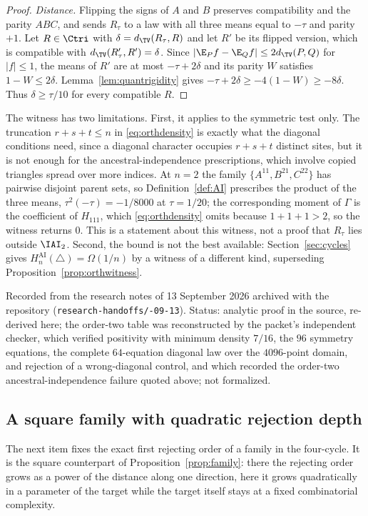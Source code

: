 \begin{proof}
\emph{Distance.} Flipping the signs of $A$ and $B$ preserves compatibility and the parity $ABC$, and sends $R_\tau$ to a law with all three means equal to $-\tau$ and parity $+1$. Let $R\in\Ctri$ with $\delta=d_{\TV}(R_\tau,R)$ and let $R'$ be its flipped version, which is compatible with $d_{\TV}(R'_\tau,R')=\delta$. Since $|\E_Pf-\E_Qf|\le2d_{\TV}(P,Q)$ for $|f|\le1$, the means of $R'$ are at most $-\tau+2\delta$ and its parity $W$ satisfies $1-W\le2\delta$. Lemma~\ref{lem:quantrigidity} gives $-\tau+2\delta\ge-4(1-W)\ge-8\delta$. Thus $\delta\ge\tau/10$ for every compatible $R$.
\end{proof}

The witness has two limitations. First, it applies to the symmetric test only. The truncation $r+s+t\le n$ in \eqref{eq:orthdensity} is exactly what the diagonal conditions need, since a diagonal character occupies $r+s+t$ distinct sites, but it is not enough for the ancestral-independence prescriptions, which involve copied triangles spread over more indices. At $n=2$ the family $\{A^{11},B^{21},C^{22}\}$ has pairwise disjoint parent sets, so Definition~\ref{def:AI} prescribes the product of the three means, $\tau^2(-\tau)=-1/8000$ at $\tau=1/20$; the corresponding moment of $\Gamma$ is the coefficient of $H_{111}$, which \eqref{eq:orthdensity} omits because $1+1+1>2$, so the witness returns $0$. This is a statement about this witness, not a proof that $R_\tau$ lies outside $\IAI_2$. Second, the bound is not the best available: Section~\ref{sec:cycles} gives $H_n^{\mathrm{AI}}(\triangle)=\Omega(1/n)$ by a witness of a different kind, superseding Proposition~\ref{prop:orthwitness}.

Recorded from the research notes of 13 September 2026 archived with the repository (\texttt{research-\allowbreak handoffs/-09-13}). Status: analytic proof in the source, re-derived here; the order-two table was reconstructed by the packet's independent checker, which verified positivity with minimum density $7/16$, the $96$ symmetry equations, the complete $64$-equation diagonal law over the $4096$-point domain, and rejection of a wrong-diagonal control, and which recorded the order-two ancestral-independence failure quoted above; not formalized.

\subsection*{A square family with quadratic rejection depth}

The next item fixes the exact first rejecting order of a family in the four-cycle. It is the square counterpart of Proposition~\ref{prop:family}: there the rejecting order grows as a power of the distance along one direction, here it grows quadratically in a parameter of the target while the target itself stays at a fixed combinatorial complexity.

